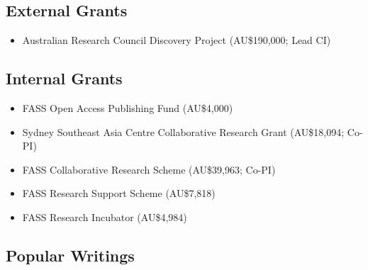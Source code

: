 \documentclass[10pt]{article}
\begin{document}
	\subsection*{External Grants}
	\begin{itemize}
		\item {} Australian Research Council Discovery Project (AU\$190,000; Lead CI)
	\end{itemize}
	\subsection*{Internal Grants}
	\begin{itemize}
		\item {} FASS Open Access Publishing Fund (AU\$4,000)
		\item {} Sydney Southeast Asia Centre Collaborative Research Grant (AU\$18,094; Co-PI)
		\item {} FASS Collaborative Research Scheme (AU\$39,963; Co-PI)
		\item {} FASS Research Support Scheme (AU\$7,818)
		\item {} FASS Research Incubator (AU\$4,984)
	\end{itemize}
	
	\subsection*{Popular Writings}
	
\end{document}
